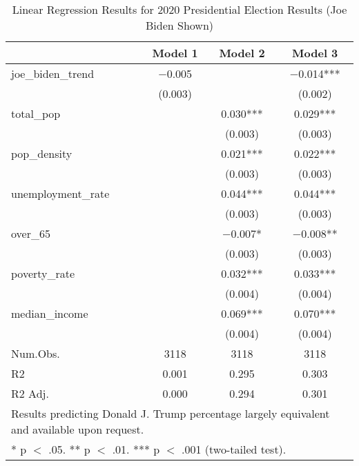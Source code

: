 \begin{table}[!h]

\caption{\label{tab:pres_2020_analysis}Linear Regression Results for 2020 Presidential Election Results (Joe Biden Shown)}
\centering
\fontsize{8}{10}\selectfont

\begin{tabular}{lccc}
\toprule
  & Model 1 & Model 2 & Model 3\\
\midrule

joe\_biden\_trend & \num{-0.005} &  & \num{-0.014}***\\
 & (\num{0.003}) &  & (\num{0.002})\\
total\_pop &  & \num{0.030}*** & \num{0.029}***\\
 &  & (\num{0.003}) & \vphantom{3} (\num{0.003})\\
pop\_density &  & \num{0.021}*** & \num{0.022}***\\
 &  & (\num{0.003}) & \vphantom{2} (\num{0.003})\\
unemployment\_rate &  & \num{0.044}*** & \num{0.044}***\\
 &  & (\num{0.003}) & \vphantom{1} (\num{0.003})\\
over\_65 &  & \num{-0.007}* & \num{-0.008}**\\
 &  & (\num{0.003}) & (\num{0.003})\\
poverty\_rate &  & \num{0.032}*** & \num{0.033}***\\
 &  & (\num{0.004}) & \vphantom{1} (\num{0.004})\\
median\_income &  & \num{0.069}*** & \num{0.070}***\\
 &  & (\num{0.004}) & (\num{0.004})\\
\midrule
Num.Obs. & \num{3118} & \num{3118} & \num{3118}\\
R2 & \num{0.001} & \num{0.295} & \num{0.303}\\
R2 Adj. & \num{0.000} & \num{0.294} & \num{0.301}\\
\bottomrule
\multicolumn{4}{l}{\rule{0pt}{1em}Results predicting Donald J. Trump percentage largely equivalent and available upon request.}\\
\multicolumn{4}{l}{\rule{0pt}{1em}* p $<$ .05. ** p $<$ .01. *** p $<$ .001 (two-tailed test).}\\
\end{tabular}
\end{table}